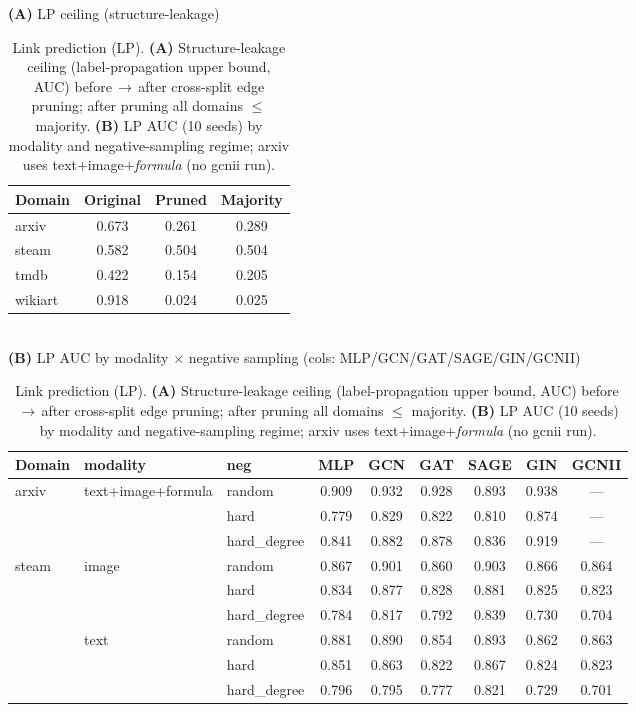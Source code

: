 \begin{table}[ht]
\centering\small\setlength{\tabcolsep}{4.5pt}\renewcommand{\arraystretch}{1.08}
\caption{Link prediction (LP). \textbf{(A)} Structure-leakage ceiling (label-propagation upper bound, AUC) before\,$\to$\,after cross-split edge pruning; after pruning all domains $\leq$ majority. \textbf{(B)} LP AUC (10 seeds) by modality and negative-sampling regime; arxiv uses text+image+\emph{formula} (no gcnii run).}
\label{tab:lp}
\textbf{(A)} LP ceiling (structure-leakage)\\[2pt]
\begin{tabular}{lccc}
\toprule
Domain & Original & Pruned & Majority \\
\midrule
arxiv     & 0.673 & 0.261 & 0.289 \\
steam     & 0.582 & 0.504 & 0.504 \\
tmdb      & 0.422 & 0.154 & 0.205 \\
wikiart   & 0.918 & 0.024 & 0.025 \\
\bottomrule\end{tabular}\\[8pt]
\textbf{(B)} LP AUC by modality $\times$ negative sampling (cols: MLP/GCN/GAT/SAGE/GIN/GCNII)\\[2pt]
\begin{tabular}{lllcccccc}
\toprule
Domain & modality & neg & MLP & GCN & GAT & SAGE & GIN & GCNII \\
\midrule
arxiv    & text+image+formula & random         & 0.909 & 0.932 & 0.928 & 0.893 & 0.938 & --- \\
         &                  & hard           & 0.779 & 0.829 & 0.822 & 0.810 & 0.874 & --- \\
         &                  & hard\_degree   & 0.841 & 0.882 & 0.878 & 0.836 & 0.919 & --- \\
\midrule
steam    & image            & random         & 0.867 & 0.901 & 0.860 & 0.903 & 0.866 & 0.864 \\
         &                  & hard           & 0.834 & 0.877 & 0.828 & 0.881 & 0.825 & 0.823 \\
         &                  & hard\_degree   & 0.784 & 0.817 & 0.792 & 0.839 & 0.730 & 0.704 \\
         & text             & random         & 0.881 & 0.890 & 0.854 & 0.893 & 0.862 & 0.863 \\
         &                  & hard           & 0.851 & 0.863 & 0.822 & 0.867 & 0.824 & 0.823 \\
         &                  & hard\_degree   & 0.796 & 0.795 & 0.777 & 0.821 & 0.729 & 0.701 \\

\end{tabular}
\end{table}
